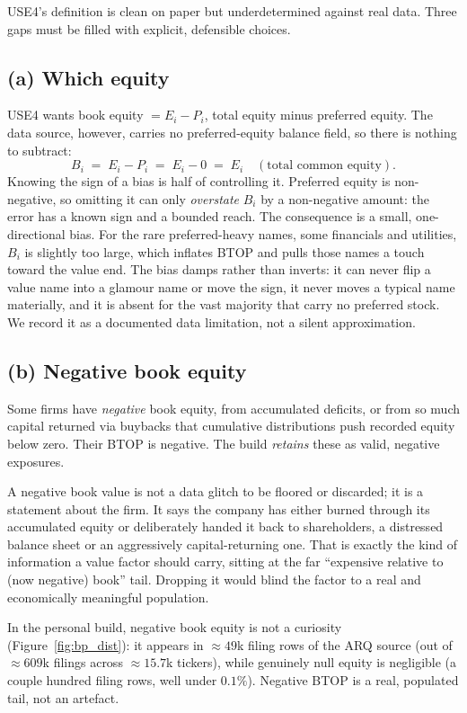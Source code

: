 \documentclass[11pt]{article}
\theoremstyle{definition}
\theoremstyle{plain}
\theoremstyle{remark}
\begin{document}
USE4's definition is clean on paper but underdetermined against real data. Three gaps must be filled with explicit, defensible choices.

\subsection*{(a) Which equity}
USE4 wants book equity $= E_i - P_i$, total equity minus preferred equity. The data source, however, carries no preferred-equity balance field, so there is nothing to subtract:
\[
  B_i \;=\; E_i - P_i \;=\; E_i - 0 \;=\; E_i \quad(\text{total common equity}).
\]
Knowing the sign of a bias is half of controlling it. Preferred equity is non-negative, so omitting it can only \emph{overstate} $B_i$ by a non-negative amount: the error has a known sign and a bounded reach. The consequence is a small, one-directional bias. For the rare preferred-heavy names, some financials and utilities, $B_i$ is slightly too large, which inflates BTOP and pulls those names a touch toward the value end. The bias damps rather than inverts: it can never flip a value name into a glamour name or move the sign, it never moves a typical name materially, and it is absent for the vast majority that carry no preferred stock. We record it as a documented data limitation, not a silent approximation.

\subsection*{(b) Negative book equity}
Some firms have \emph{negative} book equity, from accumulated deficits, or from so much capital returned via buybacks that cumulative distributions push recorded equity below zero. Their BTOP is negative. The build \emph{retains} these as valid, negative exposures.

\begin{intuition}
A negative book value is not a data glitch to be floored or discarded; it is a statement about the firm. It says the company has either burned through its accumulated equity or deliberately handed it back to shareholders, a distressed balance sheet or an aggressively capital-returning one. That is exactly the kind of information a value factor should carry, sitting at the far ``expensive relative to (now negative) book'' tail. Dropping it would blind the factor to a real and economically meaningful population.
\end{intuition}

\begin{observed}
In the personal build, negative book equity is not a curiosity (Figure~\ref{fig:bp_dist}): it appears in $\approx 49$k filing rows of the ARQ source (out of $\approx 609$k filings across $\approx 15.7$k tickers), while genuinely null equity is negligible (a couple hundred filing rows, well under $0.1\%$). Negative BTOP is a real, populated tail, not an artefact.
\end{observed}
\end{document}
